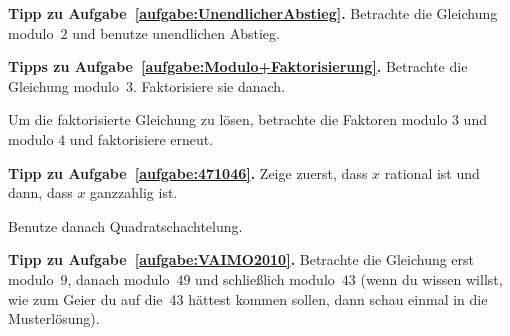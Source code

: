 \textbf{Tipp zu Aufgabe~\ref{aufgabe:UnendlicherAbstieg}.} Betrachte die Gleichung modulo~$2$ und benutze unendlichen Abstieg.

\textbf{Tipps zu Aufgabe~\ref{aufgabe:Modulo+Faktorisierung}.} Betrachte die Gleichung modulo~$3$. Faktorisiere sie danach.

Um die faktorisierte Gleichung zu lösen, betrachte die Faktoren modulo $3$ und modulo $4$ und faktorisiere erneut.


\textbf{Tipp zu Aufgabe~\ref{aufgabe:471046}.} Zeige zuerst, dass $x$ rational ist und dann, dass $x$ ganzzahlig ist.

Benutze danach Quadratschachtelung.


\textbf{Tipp zu Aufgabe~\ref{aufgabe:VAIMO2010}.} Betrachte die Gleichung erst modulo~$9$, danach modulo~$49$ und schließlich modulo~$43$ (wenn du wissen willst, wie zum Geier du auf die~43 hättest kommen sollen, dann schau einmal in die Musterlösung).